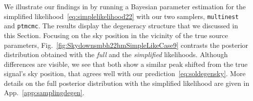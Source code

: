 \documentclass[aps,showpacs,twocolumn,prd,superscriptaddress,nofootinbib]{revtex4-1}
\newcommand{\be}{\begin{equation}}
\newcommand{\ee}{\end{equation}}
\newcommand\calL{{\mathcal{L}}}
\newcommand\betaL{{\beta_{L}}}
\newcommand\lambdaL{{\lambda_{L}}}
\newcommand\varphiL{{\varphi_{L}}}
\newcommand\psiL{{\psi_{L}}}
\begin{document}
We illustrate our findings in  by running a Bayesian parameter estimation for the simplified likelihood~\eqref{eq:simplelikelihood22} with our two samplers, \texttt{multinest} and \texttt{ptmcmc}. The results display the degeneracy structure that we discussed in this Section. Focusing on the sky position in the vicinity of the true source parameters, Fig.~\ref{fig:Skydownsmbh22hmSimpleLikeCase9} contrasts the posterior distribution obtained with the \textit{full} and the \textit{simplified} likelihoods. Although differences are visible, we see that both show a similar peak shifted from the true signal's sky position, that agrees well with our prediction~\eqref{eq:soldegensky}. More details on the full posterior distribution with the simplified likelihood are given in App.~\ref{app:samplingdegen}.

%
\end{document}
